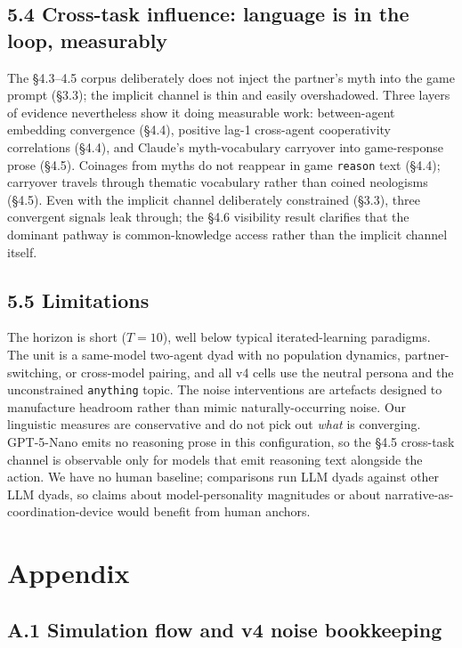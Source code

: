 \documentclass[10pt,letterpaper]{article}
\begin{document}
\subsection{5.4 Cross-task influence: language is in the loop,
measurably}\label{cross-task-influence-language-is-in-the-loop-measurably}

The §4.3--4.5 corpus deliberately does not inject the partner's myth
into the game prompt (§3.3); the implicit channel is thin and easily
overshadowed. Three layers of evidence nevertheless show it doing
measurable work: between-agent embedding convergence (§4.4), positive
lag-1 cross-agent cooperativity correlations (§4.4), and Claude's
myth-vocabulary carryover into game-response prose (§4.5). Coinages from
myths do not reappear in game \texttt{reason} text (§4.4); carryover
travels through thematic vocabulary rather than coined neologisms
(§4.5). Even with the implicit channel deliberately constrained (§3.3),
three convergent signals leak through; the §4.6 visibility result
clarifies that the dominant pathway is common-knowledge access rather
than the implicit channel itself.

\subsection{5.5 Limitations}\label{limitations}

The horizon is short (\(T = 10\)), well below typical iterated-learning
paradigms. The unit is a same-model two-agent dyad with no population
dynamics, partner-switching, or cross-model pairing, and all v4 cells
use the neutral persona and the unconstrained \texttt{anything} topic.
The noise interventions are artefacts designed to manufacture headroom
rather than mimic naturally-occurring noise. Our linguistic measures are
conservative and do not pick out \emph{what} is converging. GPT-5-Nano
emits no reasoning prose in this configuration, so the §4.5 cross-task
channel is observable only for models that emit reasoning text alongside
the action. We have no human baseline; comparisons run LLM dyads against
other LLM dyads, so claims about model-personality magnitudes or about
narrative-as-coordination-device would benefit from human anchors.

\section{Appendix}\label{appendix}

\subsection{A.1 Simulation flow and v4 noise
bookkeeping}\label{a.1-simulation-flow-and-v4-noise-bookkeeping}
\end{document}
